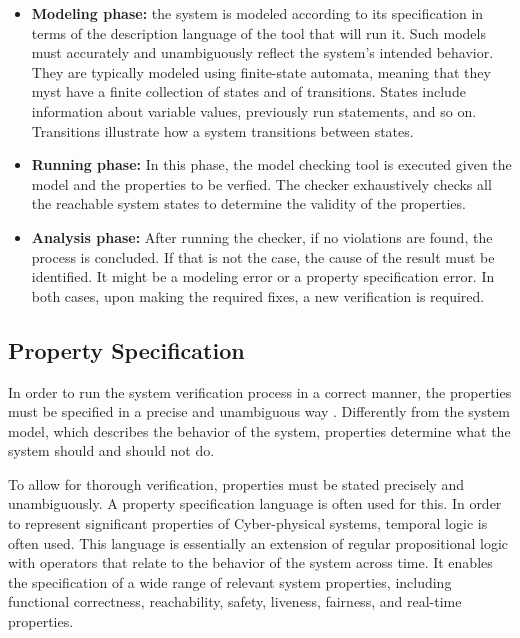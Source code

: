 \begin{itemize}
    \item \textbf{Modeling phase:} the system is modeled according to its specification in terms of the description language of the tool that will run it. Such models must accurately and unambiguously reflect the system's intended behavior. They are typically modeled using finite-state automata, meaning that they myst have a finite collection of states and of transitions. States include information about variable values, previously run statements, and so on. Transitions illustrate how a system transitions between states. 
    
	\item \textbf{Running phase:} In this phase, the model checking tool is executed given the model and the properties to be verfied. The checker exhaustively checks all the reachable system states to determine the validity of the properties.
	
	\item \textbf{Analysis phase:} After running the checker, if no violations are found, the process is concluded. If that is not the case, the cause of the result must be identified. It might be a modeling error or a property specification error. In both cases, upon making the required fixes, a new verification is required.
    
\end{itemize}

\subsection{Property Specification}
\label{sec:property_spec}

In order to run the system verification process in a correct manner, the properties must be specified in a precise and unambiguous way \cite{2008PrinciplesModelChecking}. Differently from the system model, which describes the behavior of the system, properties determine what the system should and should not do.

To allow for thorough verification, properties must be stated precisely and unambiguously. A property specification language is often used for this. In order to represent significant properties of Cyber-physical systems, temporal logic is often used. This language is essentially an extension of regular propositional logic with operators that relate to the behavior of the system across time. It enables the specification of a wide range of relevant system properties, including functional correctness, reachability, safety, liveness, fairness, and real-time properties.

